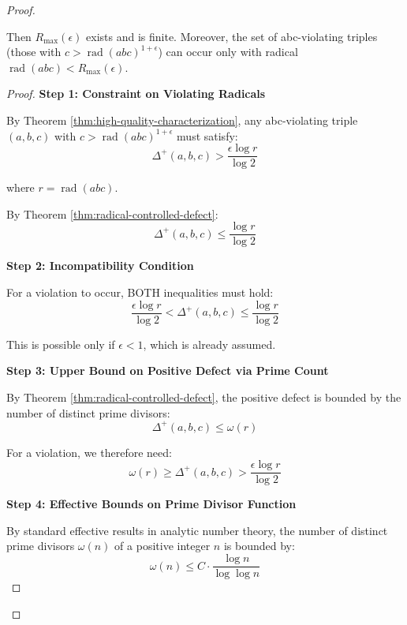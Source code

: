 \begin{proof}
\begin{theorem}
Then $R_{\max}(\epsilon)$ exists and is finite. Moreover, the set of abc-violating triples (those with $c > \operatorname{rad}(abc)^{1+\epsilon}$) can occur only with radical $\operatorname{rad}(abc) < R_{\max}(\epsilon)$.

\end{theorem}

\begin{proof}

\noindent \textbf{Step 1: Constraint on Violating Radicals}

By Theorem \ref{thm:high-quality-characterization}, any abc-violating triple $(a,b,c)$ with $c > \operatorname{rad}(abc)^{1+\epsilon}$ must satisfy:
\begin{equation}
\Delta^{+}(a,b,c) > \frac{\epsilon \log r}{\log 2}
\end{equation}

where $r = \operatorname{rad}(abc)$.

By Theorem \ref{thm:radical-controlled-defect}:
\begin{equation}
\Delta^{+}(a,b,c) \leq \frac{\log r}{\log 2}
\end{equation}

\noindent \textbf{Step 2: Incompatibility Condition}

For a violation to occur, BOTH inequalities must hold:
\begin{equation}
\frac{\epsilon \log r}{\log 2} < \Delta^{+}(a,b,c) \leq \frac{\log r}{\log 2}
\end{equation}

This is possible only if $\epsilon < 1$, which is already assumed.

\noindent \textbf{Step 3: Upper Bound on Positive Defect via Prime Count}

By Theorem \ref{thm:radical-controlled-defect}, the positive defect is bounded by the number of distinct prime divisors:
\begin{equation}
\Delta^{+}(a,b,c) \leq \omega(r)
\end{equation}

For a violation, we therefore need:
\begin{equation}
\omega(r) \geq \Delta^{+}(a,b,c) > \frac{\epsilon \log r}{\log 2}
\end{equation}

\noindent \textbf{Step 4: Effective Bounds on Prime Divisor Function}

By standard effective results in analytic number theory, the number of distinct prime divisors $\omega(n)$ of a positive integer $n$ is bounded by:
\begin{equation}
\omega(n) \leq C \cdot \frac{\log n}{\log \log n}
\end{equation}


\end{proof}
\end{proof}
